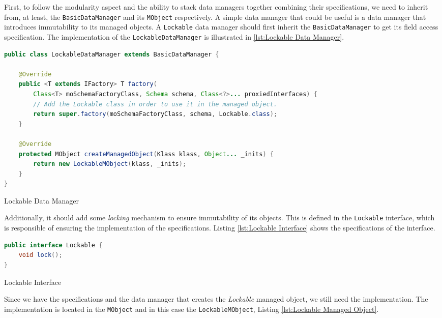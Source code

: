 First, to follow the modularity aspect and the ability to stack data managers together combining their specifications, we need to inherit from, at least, the \texttt{BasicDataManager} and its \texttt{MObject} respectively.
A simple data manager that could be useful is a data manager that introduces immutability to its managed objects.
A \texttt{Lockable} data manager should first inherit the \texttt{BasicDataManager} to get its field access specification.
The implementation of the \texttt{LockableDataManager} is illustrated in \ref{lst:Lockable Data Manager}.

\begin{sourcecode} [H]
	\begin{lstlisting}[language=Java, escapechar=|]
public class LockableDataManager extends BasicDataManager {

	@Override
    public <T extends IFactory> T factory(
    	Class<T> moSchemaFactoryClass, Schema schema, Class<?>... proxiedInterfaces) {
        // Add the Lockable class in order to use it in the managed object.
        return super.factory(moSchemaFactoryClass, schema, Lockable.class);
    }

	@Override
	protected MObject createManagedObject(Klass klass, Object... _inits) {
		return new LockableMObject(klass, _inits);
	}
}
	\end{lstlisting}
	\caption{Lockable Data Manager}
	\label{lst:Lockable Data Manager}
\end{sourcecode}

Additionally, it should add some \textit{locking} mechanism to ensure immutability of its objects.
This is defined in the \texttt{Lockable} interface, which is responsible of ensuring the implementation of the specifications. 
Listing \ref{lst:Lockable Interface} shows the specifications of the interface.

\begin{sourcecode} [H]
	\begin{lstlisting}[language=Java, escapechar=|]
public interface Lockable {
	void lock();
}
	\end{lstlisting}
	\caption{Lockable Interface}
	\label{lst:Lockable Interface}
\end{sourcecode}

Since we have the specifications and the data manager that creates the \textit{Lockable} managed object, we still need the implementation.
The implementation is located in the \texttt{MObject} and in this case the \texttt{LockableMObject}, 
Listing \ref{lst:Lockable Managed Object}.

